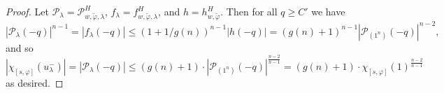 \documentclass[eqthmnum,nocolour,skinny]{jt-calcs}
\begin{document}
\begin{proof}
Let $\mathcal{P}_{\lambda} = \mathcal{P}_{w,\widetilde{\varphi},\lambda}^H$, $f_{\lambda} = f_{w,\widetilde{\varphi},\lambda}^H$, and $h = h_{w,\widetilde{\varphi}}^H$. Then for all $q \geq C'$ we have
\begin{equation*}
|\mathcal{P}_{\lambda}(-q)|^{n-1}=|f_{\lambda}(-q)| \leq (1+1/g(n))^{n-1}|h(-q)| = (g(n)+1)^{n-1}|\mathcal{P}_{(1^n)}(-q)|^{n-2},
\end{equation*}
and so
\begin{equation*}
|\chi_{[s,\varphi]}(u_{\lambda}^-)| = |\mathcal{P}_{\lambda}(-q)| \leqslant (g(n)+1)\cdot |\mathcal{P}_{(1^n)}(-q)|^{\frac{n-2}{n-1}} = (g(n)+1) \cdot \chi_{[s,\varphi]}(1)^{\frac{n-2}{n-1}}
\end{equation*}
as desired.
\end{proof}
\end{document}
